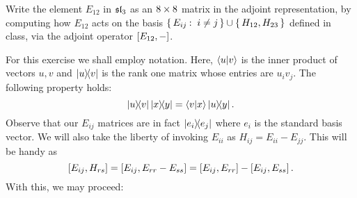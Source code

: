 \documentclass[12pt]{memoir}
\begin{document}
\begin{Ej}
    Write the element $E_{12}$ in $\mathfrak{sl}_3$ as an $8\times 8$ matrix in the adjoint representation, by computing
how $E_{12}$ acts on the basis $\{\,E_{ij}\mathbin{:}\ i\neq j\,\} \cup\{\,H_{12}, H_{23}\,\}$ defined in class, via the adjoint operator $\left\lbrack E_{12},-\right\rbrack$.
\end{Ej}
For this exercise we shall employ  notation. Here, $\braket{u}{v}$ is the inner product of vectors $u,v$ and $\ketbra{u}{v}$ is the rank one matrix whose entries are $u_iv_j$. The following property holds:
$$\ketbra{u}{v}\ketbra{x}{y}=\braket{v}{x}\ketbra{u}{y}.$$
Observe that our $E_{ij}$ matrices are in fact $\ketbra{e_i}{e_j}$ where $e_i$ is the standard basis vector. We will also take the liberty of invoking $E_{ii}$ as $H_{ij}=E_{ii}-E_{jj}$. This will be handy as 
$$\left\lbrack E_{ij},H_{rs}\right\rbrack=\left\lbrack E_{ij},E_{rr}-E_{ss}\right\rbrack=\left\lbrack E_{ij},E_{rr}\right\rbrack-\left\lbrack E_{ij},E_{ss}\right\rbrack.$$
With this, we may proceed:
\end{document}
